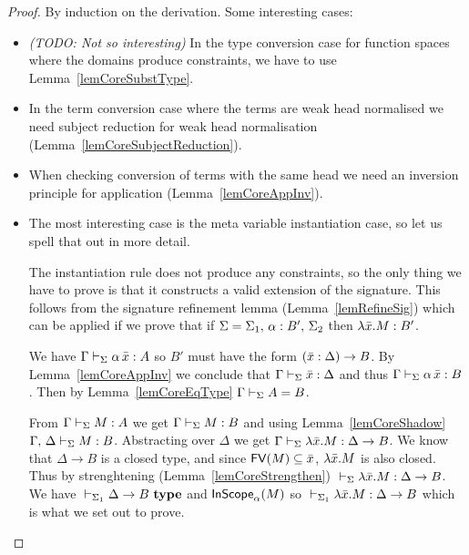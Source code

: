 \begin{proof}
    By induction on the derivation. Some interesting cases:
    \begin{itemize}

	\item {\em (TODO: Not so interesting)} In the type conversion case for
	function spaces where the domains produce constraints, we have to use
	Lemma~\ref{lemCoreSubstType}.

	\item In the term conversion case where the terms are weak head
	normalised we need subject reduction for weak head normalisation
	(Lemma~\ref{lemCoreSubjectReduction}).

	\item When checking conversion of terms with the same head we need an
	inversion principle for application (Lemma~\ref{lemCoreAppInv}).


	\item The most interesting case is the meta variable instantiation
	case, so let us spell that out in more detail.

	The instantiation rule does not produce any constraints, so the only
	thing we have to prove is that it constructs a valid extension of the
	signature. This follows from the signature refinement lemma
	(Lemma~\ref{lemRefineSig}) which can be applied if we prove that if
	$\Sigma = {\Sigma_1},\,{} {{\alpha} : {B'}},\,{} \Sigma_2$ then
	$\lambda \bar x.{} M : {B'}$.

	We have ${\Gamma} \vdash_{\Sigma} {\alpha \, \bar x} : {A}$ so $B'$ must
	have the form $(\bar x:\Delta)\to{} B$. By Lemma~\ref{lemCoreAppInv} we
	conclude that ${\Gamma} \vdash_{\Sigma} {\bar x} : {\Delta}$ and thus
	${\Gamma} \vdash_{\Sigma} {\alpha \, \bar x} : {B}$. Then by
	Lemma~\ref{lemCoreEqType} ${\Gamma} \vdash_{\Sigma}A=B$.

	From ${\Gamma} \vdash_{\Sigma} {M} : {A}$ we get ${\Gamma} \vdash_{\Sigma} {M} : {B}$ and using Lemma~\ref{lemCoreShadow} ${{\Gamma},\,{}
	\Delta} \vdash_{\Sigma} {M} : {B}$. Abstracting over $\Delta$ we get ${\Gamma} \vdash_{\Sigma} {\lambda \bar x.{} M} : {\Delta \to B}$. We know that $\Delta \to B$
	is a closed type, and since $\mathsf{FV}({M}) \subseteq \bar x$, $\lambda \bar x.{}
	M$ is also closed. Thus by strenghtening
	(Lemma~\ref{lemCoreStrengthen}) ${} \vdash_{\Sigma} {\lambda \bar x.{} M} : {\Delta \to B}$. We have ${} \vdash_{\Sigma_1}\Delta \to B ~ \mathbf{type}$ and
	$\mathsf{InScope}_{\alpha}({M})$ so ${} \vdash_{\Sigma_1} {\lambda \bar x.{} M} : {\Delta \to B}$ which is what we set out to prove.


    \end{itemize}
\end{proof}

